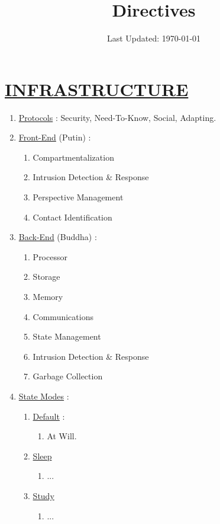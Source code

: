 \documentclass[11pt]{article}
\title{	
	\normalfont \normalsize 
	\huge Directives
}
\date{Last Updated: \normalsize\today}
\begin{document}
\maketitle
\section*{\ul{INFRASTRUCTURE}}
\begin{enumerate}
	\item[] \ul{Protocols} : Security, Need-To-Know, Social, Adapting.
	
	\item[] \ul{Front-End} (Putin) :
	\begin{enumerate}
		\item[] Compartmentalization
		\item[] Intrusion Detection \& Response
		\item[] Perspective Management
		\item[] Contact Identification
	\end{enumerate}

	\item[] \ul{Back-End} (Buddha) :
	\begin{enumerate}
		\item[] Processor
		\item[] Storage
		\item[] Memory
		\item[] Communications
		\item[] State Management
		\item[] Intrusion Detection \& Response
		\item[] Garbage Collection
	\end{enumerate}

	\item[] \ul{State Modes} :
	\begin{enumerate}
		\item[] \ul{Default} :
		\begin{enumerate}
			\item[] At Will.
		\end{enumerate}
	
		\item[] \ul{Sleep}
		\begin{enumerate}
			\item[] ...
		\end{enumerate}

		\item[] \ul{Study}
		\begin{enumerate}
			\item[] ...
		\end{enumerate}
	

\end{enumerate}
\end{enumerate}
\end{document}
